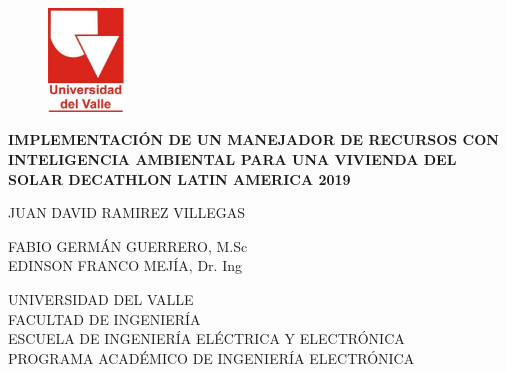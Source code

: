 \pagestyle{empty}
\begin{center}

\begin{figure}[htbp]
	\centering
		\includegraphics[width=2cm]{figuras/Logo_UV.pdf}
\end{figure}

\vspace{2cm}

\textbf{\large{IMPLEMENTACI\'ON DE UN MANEJADOR DE RECURSOS CON INTELIGENCIA AMBIENTAL PARA UNA VIVIENDA DEL SOLAR DECATHLON LATIN AMERICA 2019}}

\vspace{2cm}

\large{
JUAN DAVID RAMIREZ VILLEGAS
}

\vspace{3cm}

\large{FABIO GERMÁN GUERRERO, M.Sc}\\
\large{EDINSON FRANCO MEJÍA, Dr. Ing}\\

\vspace{3cm}

\large{UNIVERSIDAD DEL VALLE}\\
\large{FACULTAD DE INGENIERÍA}\\
\large{ESCUELA DE INGENIERÍA ELÉCTRICA Y ELECTRÓNICA}\\
\large{PROGRAMA ACADÉMICO DE INGENIERÍA ELECTRÓNICA}\\
\large{\Today}


\vspace{4cm}

\end{center}
\newpage
